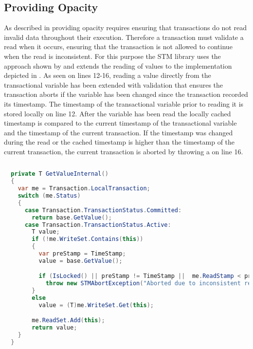 \subsection{Providing Opacity}
As described in  providing opacity requires ensuring that transactions do not read invalid data throughout their execution. Therefore a transaction must validate a read when it occurs, ensuring that the transaction is not allowed to continue when the read is inconsistent. For this purpose the \ac{STM} library uses the approach shown by \cite[p. 117]{harris2010transactional} and extends the reading of values to the implementation depicted in . As seen on lines 12-16, reading a value directly from the transactional variable has been extended with validation that ensures the transaction aborts if the variable has been changed since the transaction recorded its timestamp. The timestamp of the transactional variable prior to reading it is stored locally on line 12. After the variable has been read the locally cached timestamp is compared to the current timestamp of the transactional variable and the timestamp of the current transaction. If the timestamp was changed during the read or the cached timestamp is higher than the timestamp of the current transaction, the current transaction is aborted by throwing a  on line 16.
\begin{lstlisting}[label=lst:library_opacity,
  caption={Providing Opacity},
  language=Java,  
  showspaces=false,
  showtabs=false,
  breaklines=true,
  showstringspaces=false,
  breakatwhitespace=true,
  commentstyle=\color{greencomments},
  keywordstyle=\color{bluekeywords},
  stringstyle=\color{redstrings},
  morekeywords={atomic, retry, orElse, var, get, set}]  % Start your code-block
  
  private T GetValueInternal()
  {
    var me = Transaction.LocalTransaction;
    switch (me.Status)
    {
      case Transaction.TransactionStatus.Committed:
        return base.GetValue();
      case Transaction.TransactionStatus.Active:
        T value;
        if (!me.WriteSet.Contains(this))
        {
          var preStamp = TimeStamp;
          value = base.GetValue();

          if (IsLocked() || preStamp != TimeStamp ||  me.ReadStamp < preStamp)
            throw new STMAbortException("Aborted due to inconsistent read");
        }
        else
          value = (T)me.WriteSet.Get(this);

        me.ReadSet.Add(this);
        return value;
    }
  }
\end{lstlisting}

